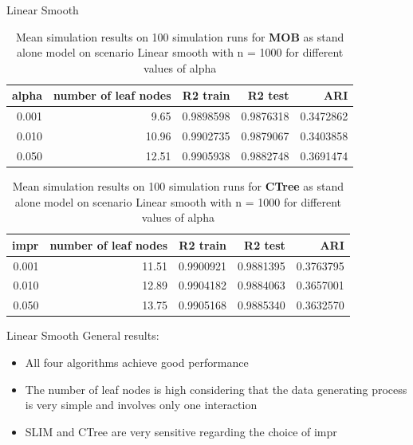\documentclass[9pt, xcolor=table]{beamer}
\begin{document}
\begin{frame}{Linear Smooth}
\begin{table}

\caption{Mean simulation results on 100 simulation runs for \textbf{MOB} as stand alone model on scenario Linear smooth with n = 1000 for different values of alpha}
\centering \small
\begin{tabular}[t]{r|r|r|r|r}
\hline
alpha & number of leaf nodes & R2 train & R2 test & ARI\\
\hline
0.001 & 9.65 & 0.9898598 & 0.9876318 & 0.3472862\\
\hline
0.010 & 10.96 & 0.9902735 & 0.9879067 & 0.3403858\\
\hline
0.050 & 12.51 & 0.9905938 & 0.9882748 & 0.3691474\\
\hline
\end{tabular}
\end{table} 


\begin{table}

\caption{Mean simulation results on 100 simulation runs for \textbf{CTree} as stand alone model on scenario Linear smooth with n = 1000 for different values of alpha}
\centering \small
\begin{tabular}[t]{r|r|r|r|r}
\hline
impr & number of leaf nodes & R2 train & R2 test & ARI\\
\hline
0.001 & 11.51 & 0.9900921 & 0.9881395 & 0.3763795\\
\hline
0.010 & 12.89 & 0.9904182 & 0.9884063 & 0.3657001\\
\hline
0.050 & 13.75 & 0.9905168 & 0.9885340 & 0.3632570\\
\hline
\end{tabular}
\end{table}
\end{frame}

\begin{frame}{Linear Smooth}
General results:
\begin{itemize}
    \item All four algorithms achieve good performance
    \item The number of leaf nodes is high considering that the data generating process is very simple and involves only one interaction 
    \item SLIM and CTree are very sensitive regarding the choice of impr
    
\end{itemize}
    
\end{frame}
\end{document}
